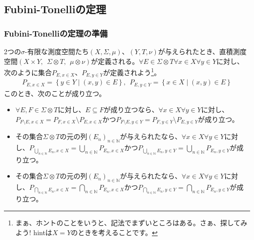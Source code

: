 \documentclass[dvipdfmx]{jsarticle}
\begin{document}
\subsection{Fubini-Tonelliの定理}%
\subsubsection{Fubini-Tonelliの定理の準備}%
\begin{thm}\label{4.6.4.1}
2つの$\sigma$-有限な測度空間たち$(X,\varSigma,\mu)$、$(Y,T,\nu)$が与えられたとき、直積測度空間$(X \times Y,\ \ \varSigma \otimes T,\ \ \mu \otimes \nu)$が定義される。$\forall E \in \varSigma \otimes T\forall x \in X\forall y \in Y$に対し、次のように集合$P_{E,x \in X}$、$P_{E,y \in Y}$が定義されよう\footnote{まぁ、ホントのことをいうと、記法でまずいところはある。さぁ、探してみよう! hintは$X = Y$のときを考えることです。}。
\begin{align*}
P_{E,x \in X} = \left\{ y \in Y \middle| (x,y) \in E \right\},\ \ P_{E,y \in Y} = \left\{ x \in X \middle| (x,y) \in E \right\}
\end{align*}
このとき、次のことが成り立つ。
\begin{itemize}
\item
  $\forall E,F \in \varSigma \otimes T$に対し、$E \subseteq F$が成り立つなら、$\forall x \in X\forall y \in Y$に対し、$P_{F \setminus E,x \in X} = P_{F,x \in X} \setminus P_{E,x \in X}$かつ$P_{F \setminus E,y \in Y} = P_{F,y \in Y} \setminus P_{E,y \in Y}$が成り立つ。
\item
  その集合$\varSigma \otimes T$の元の列$\left( E_{n} \right)_{n \in \mathbb{N}}$が与えられたなら、$\forall x \in X\forall y \in Y$に対し、$P_{\bigcup_{n \in \mathbb{N}} E_{n},x \in X} = \bigcup_{n \in \mathbb{N}} P_{E_{n},x \in X}$かつ$P_{\bigcup_{n \in \mathbb{N}} E_{n},y \in Y} = \bigcup_{n \in \mathbb{N}} P_{E_{n},y \in Y}$が成り立つ。
\item
  その集合$\varSigma \otimes T$の元の列$\left( E_{n} \right)_{n \in \mathbb{N}}$が与えられたなら、$\forall x \in X\forall y \in Y$に対し、$P_{\bigcap_{n \in \mathbb{N}} E_{n},x \in X} = \bigcap_{n \in \mathbb{N}} P_{E_{n},x \in X}$かつ$P_{\bigcap_{n \in \mathbb{N}} E_{n},y \in Y} = \bigcap_{n \in \mathbb{N}} P_{E_{n},y \in Y}$が成り立つ。
\end{itemize}
\end{thm}
\end{document}
